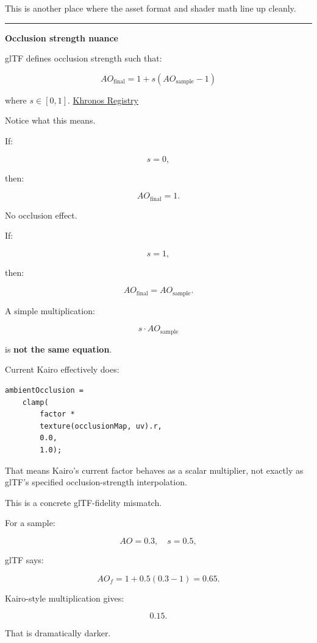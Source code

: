 This is another place where the asset format and shader math line up cleanly.

\begin{center}\rule{0.5\linewidth}{0.5pt}\end{center}

\textbf{Occlusion strength nuance}

glTF defines occlusion strength such that:

\[
\boxed{
AO_{\text{final}}
=
1+
s(AO_{\text{sample}}-1)
}
\]

where \(s\in[0,1]\). \href{https://registry.khronos.org/glTF/specs/2.0/glTF-2.0.html?initialSessionID=262-7493612-7323838&ld=ASXXSCTFRDirect&utm_source=chatgpt.com}{Khronos Registry}

Notice what this means.

If:

\[
s=0,
\]

then:

\[
AO_{\text{final}}=1.
\]

No occlusion effect.

If:

\[
s=1,
\]

then:

\[
AO_{\text{final}}
=
AO_{\text{sample}}.
\]

A simple multiplication:

\[
s\cdot AO_{\text{sample}}
\]

is \textbf{not the same equation}.

Current Kairo effectively does:

\begin{verbatim}
ambientOcclusion =
    clamp(
        factor *
        texture(occlusionMap, uv).r,
        0.0,
        1.0);
\end{verbatim}

That means Kairo's current  factor behaves as a scalar multiplier, not exactly as glTF's specified occlusion-strength interpolation.

This is a concrete glTF-fidelity mismatch.

For a sample:

\[
AO=0.3,
\quad
s=0.5,
\]

glTF says:

\[
AO_f=
1+0.5(0.3-1)
=
0.65.
\]

Kairo-style multiplication gives:

\[
0.15.
\]

That is dramatically darker.

